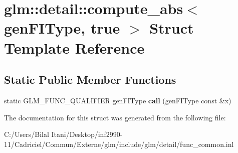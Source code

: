 \hypertarget{structglm_1_1detail_1_1compute__abs_3_01gen_f_i_type_00_01true_01_4}{}\section{glm\+:\+:detail\+:\+:compute\+\_\+abs$<$ gen\+F\+I\+Type, true $>$ Struct Template Reference}
\label{structglm_1_1detail_1_1compute__abs_3_01gen_f_i_type_00_01true_01_4}
\subsection*{Static Public Member Functions}
\begin{DoxyCompactItemize}
\item 
static G\+L\+M\+\_\+\+F\+U\+N\+C\+\_\+\+Q\+U\+A\+L\+I\+F\+I\+ER gen\+F\+I\+Type {\bfseries call} (gen\+F\+I\+Type const \&x)\hypertarget{structglm_1_1detail_1_1compute__abs_3_01gen_f_i_type_00_01true_01_4_a13dee7b421d52969e40d8cdef020d0be}{}\label{structglm_1_1detail_1_1compute__abs_3_01gen_f_i_type_00_01true_01_4_a13dee7b421d52969e40d8cdef020d0be}

\end{DoxyCompactItemize}


The documentation for this struct was generated from the following file\+:\begin{DoxyCompactItemize}
\item 
C\+:/\+Users/\+Bilal Itani/\+Desktop/inf2990-\/11/\+Cadriciel/\+Commun/\+Externe/glm/include/glm/detail/func\+\_\+common.\+inl\end{DoxyCompactItemize}
